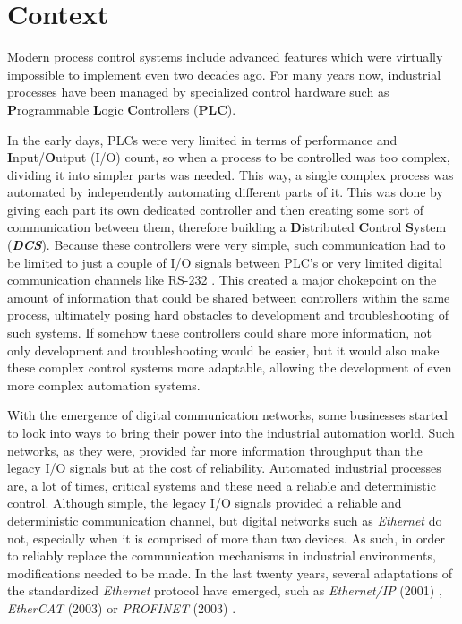 \section{Context} \label{sec:context}

Modern process control systems include advanced features which were virtually impossible to implement even two decades ago. For many years now, industrial processes have been managed by specialized control hardware such as \textbf Programmable \textbf Logic \textbf Controllers ({\bfseries PLC}).

In the early days, PLCs were very limited in terms of performance and \textbf Input/\textbf Output (I/O) count, so when a process to be controlled was too complex, dividing it into simpler parts was needed. This way, a single complex process was automated by independently automating different parts of it. This was done by giving each part its own dedicated controller and then creating some sort of communication between them, therefore building a \textbf Distributed \textbf Control \textbf System ({\bfseries\itshape DCS}). Because these controllers were very simple, such communication had to be limited to just a couple of I/O signals between PLC's or very limited digital communication channels like RS-232 \cite{protocol:rs232}. This created a major chokepoint on the amount of information that could be shared between controllers within the same process, ultimately posing hard obstacles to development and troubleshooting of such systems. If somehow these controllers could share more information, not only development and troubleshooting would be easier, but it would also make these complex control systems more adaptable, allowing the development of even more complex automation systems.

With the emergence of digital communication networks, some businesses started to look into ways to bring their power into the industrial automation world. Such networks, as they were, provided far more information throughput than the legacy I/O signals but at the cost of reliability. Automated industrial processes are, a lot of times, critical systems and these need a reliable and deterministic control. Although simple, the legacy I/O signals provided a reliable and deterministic communication channel, but digital networks such as \emph{Ethernet} \cite{protocol:ethernet} do not, especially when it is comprised of more than two devices. As such, in order to reliably replace the communication mechanisms in industrial environments, modifications needed to be made. In the last twenty years, several adaptations of the standardized \emph{Ethernet} protocol have emerged, such as \emph{Ethernet/IP} (2001) \cite{protocol:ethernetip}, \emph{EtherCAT} (2003) \cite{protocol:ethercat} or \emph{PROFINET} (2003) \cite{protocol:profinet}.

